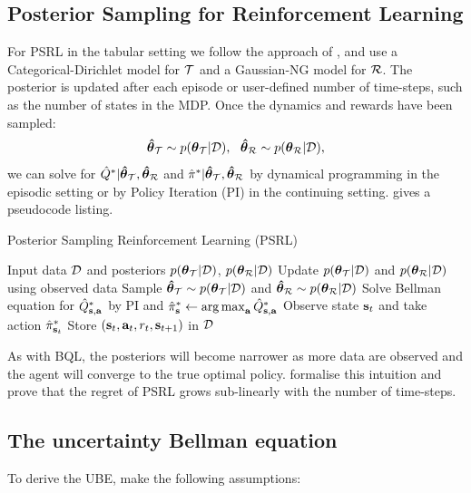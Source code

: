 \documentclass{article}
\begin{document}
\begin{appendices}
\subsection{Posterior Sampling for Reinforcement Learning} \label{app:psrl}

For PSRL in the tabular setting we follow the approach of \cite{psrl}, and use a Categorical-Dirichlet model for $\mathcal{T}$ and a Gaussian-NG model for $\mathcal{R}$. The posterior is updated after each episode or user-defined number of time-steps, such as the number of states in the MDP. Once the dynamics and rewards have been sampled:
$$\boldsymbol{\hat{\theta}}_{\mathcal{T}} \sim p(\boldsymbol{\theta}_{\mathcal{T}} | \mathcal{D}),~~ \boldsymbol{\hat{\theta}}_{\mathcal{R}} \sim p(\boldsymbol{\theta}_{\mathcal{R}} | \mathcal{D}),$$
we can solve for $\hat{Q}^* | \boldsymbol{\hat{\theta}}_{\mathcal{T}}, \boldsymbol{\hat{\theta}}_{\mathcal{R}} $ and $\hat{\pi}^* | \boldsymbol{\hat{\theta}}_{\mathcal{T}}, \boldsymbol{\hat{\theta}}_{\mathcal{R}}$ by dynamical programming in the episodic setting or by Policy Iteration (PI) in the continuing setting.  gives a pseudocode listing.

\begin{algorithm}
  \caption{Posterior Sampling Reinforcement Learning (PSRL)}\label{alg:psrl}
  \begin{algorithmic}[1]
\State Input data $\mathcal{D}$ and posteriors $p(\boldsymbol{\theta}_{\mathcal{T}} | \mathcal{D})$, $p(\boldsymbol{\theta}_{\mathcal{R}} | \mathcal{D})$
	\State Update $p(\boldsymbol{\theta}_{\mathcal{T}} | \mathcal{D})$ and $p(\boldsymbol{\theta}_{\mathcal{R}} | \mathcal{D})$ using observed data
	\State Sample $\boldsymbol{\hat{\theta}}_{\mathcal{T}} \sim p(\boldsymbol{\theta}_{\mathcal{T}} | \mathcal{D})$ and $\boldsymbol{\hat{\theta}}_{\mathcal{R}} \sim p(\boldsymbol{\theta}_{\mathcal{R}} | \mathcal{D})$
	\State Solve Bellman equation for $\hat{Q}^*_{\mathbf{s}, \mathbf{a}}$ by PI and $\hat{\pi}^*_{\mathbf{s}} \leftarrow \operatorname*{arg\,max}_{\mathbf{a}} \hat{Q}^*_{\mathbf{s}, \mathbf{a}}$
	\EndIf
	\State Observe state $\mathbf{s}_t$ and take action $\hat{\pi}^*_{\mathbf{s}_t}$
	\State Store $(\mathbf{s}_t, \mathbf{a}_t, r_t, \mathbf{s}_{t+1})$ in $\mathcal{D}$
 \EndFor
\end{algorithmic}
\end{algorithm}

As with BQL, the posteriors will become narrower as more data are observed and the agent will converge to the true optimal policy. \cite{psrl} formalise this intuition and prove that the regret of PSRL grows sub-linearly with the number of time-steps.

\subsection{The uncertainty Bellman equation}\label{app:ube}
To derive the UBE, \cite{ube} make the following assumptions:


\end{appendices}
\end{document}
